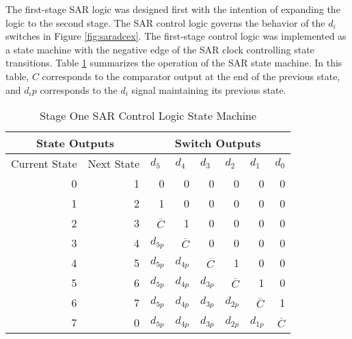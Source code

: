The first-stage SAR logic was designed first with the intention of expanding the logic to the second stage. The SAR control logic governs the behavior of the $d_i$ switches in Figure \ref{fig:saradcex}. The first-stage control logic was implemented as a state machine with the negative edge of the SAR clock controlling state transitions. Table \ref{tab:stageonestatemachine} summarizes the operation of the SAR state machine. In this table, $C$ corresponds to the comparator output at the end of the previous state, and $d_ip$ corresponds to the $d_i$ signal maintaining its previous state. 
\begin{table}[htbp]
\renewcommand*\arraystretch{1.3}
\begin{center}
\begin{tabular}{|r|r|r|r|l|r|r|r|}
\hline
\multicolumn{ 2}{|c|}{State Outputs} & \multicolumn{ 6}{c|}{Switch Outputs} \\ \hline
\multicolumn{1}{|l|}{Current State} & \multicolumn{1}{l|}{Next State} & \multicolumn{1}{l|}{$d_{5}$} & \multicolumn{1}{l|}{$d_{4}$} & $d_{3}$ & \multicolumn{1}{l|}{$d_{2}$} & \multicolumn{1}{l|}{$d_{1}$} & \multicolumn{1}{l|}{$d_{0}$} \\ \hline
0 & 1 & 0 & 0 & \multicolumn{1}{r|}{0} & 0 & 0 & 0 \\ \hline
1 & 2 & 1 & 0 & \multicolumn{1}{r|}{0} & 0 & 0 & 0 \\ \hline
2 & 3 & $\overline{C}$ & 1 & \multicolumn{1}{r|}{0} & 0 & 0 & 0 \\ \hline
3 & 4 & $d_{5p}$ & $\overline{C}$ & \multicolumn{1}{r|}{0} & 0 & 0 & 0 \\ \hline
4 & 5 & $d_{5p}$ & $d_{4p}$ & \multicolumn{1}{r|}{$\overline{C}$} & 1 & 0 & 0 \\ \hline
5 & 6 & $d_{5p}$ & $d_{4p}$ & $d_{3p}$ & $\overline{C}$ & 1 & 0 \\ \hline
6 & 7 & $d_{5p}$ & $d_{4p}$ & $d_{3p}$ & \multicolumn{1}{l|}{$d_{2p}$} & $\overline{C}$ & 1 \\ \hline
7 & 0 & $d_{5p}$ & $d_{4p}$ & $d_{3p}$ & \multicolumn{1}{l|}{$d_{2p}$} & \multicolumn{1}{l|}{$d_{1p}$} & $\overline{C}$ \\ \hline
\end{tabular}
\end{center}
\caption{Stage One SAR Control Logic State Machine}
\label{tab:stageonestatemachine}
\end{table}
